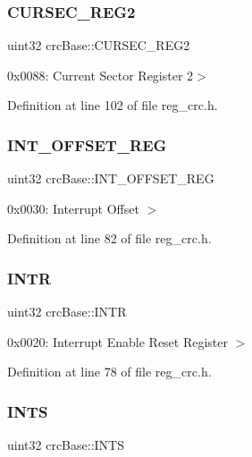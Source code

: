 \subsubsection{\texorpdfstring{C\+U\+R\+S\+E\+C\+\_\+\+R\+E\+G2}{CURSEC\_REG2}}
{\footnotesize\ttfamily uint32 crc\+Base\+::\+C\+U\+R\+S\+E\+C\+\_\+\+R\+E\+G2}

0x0088\+: Current Sector Register 2$>$ 

Definition at line 102 of file reg\+\_\+crc.\+h.

\mbox{\label{structcrcBase_a162e7d1ff1556ca613ea9e9bebb7c3f1}} 
\subsubsection{\texorpdfstring{I\+N\+T\+\_\+\+O\+F\+F\+S\+E\+T\+\_\+\+R\+EG}{INT\_OFFSET\_REG}}
{\footnotesize\ttfamily uint32 crc\+Base\+::\+I\+N\+T\+\_\+\+O\+F\+F\+S\+E\+T\+\_\+\+R\+EG}

0x0030\+: Interrupt Offset $>$ 

Definition at line 82 of file reg\+\_\+crc.\+h.

\mbox{\label{structcrcBase_a66390a9757b3a9f1681bd825f108fad3}} 
\subsubsection{\texorpdfstring{I\+N\+TR}{INTR}}
{\footnotesize\ttfamily uint32 crc\+Base\+::\+I\+N\+TR}

0x0020\+: Interrupt Enable Reset Register $>$ 

Definition at line 78 of file reg\+\_\+crc.\+h.

\mbox{\label{structcrcBase_aa34bf73c1f563f14193980b86c2c3096}} 
\subsubsection{\texorpdfstring{I\+N\+TS}{INTS}}
{\footnotesize\ttfamily uint32 crc\+Base\+::\+I\+N\+TS}


